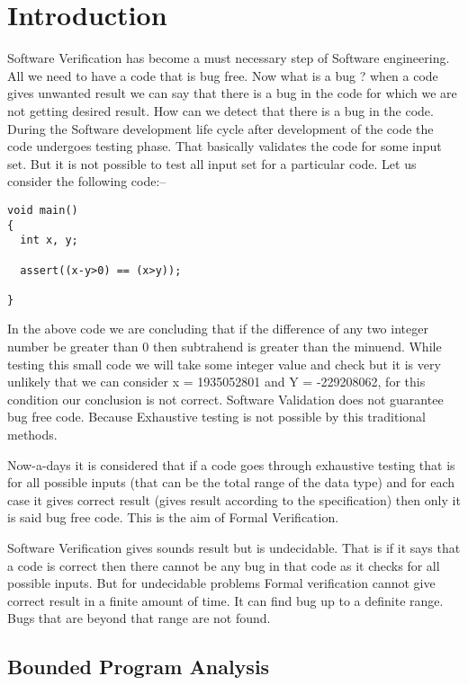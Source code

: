 \chapter{Introduction}
Software Verification has become a must necessary step of Software engineering.
All we need to have a code that is bug free. Now what is a bug ? when a code 
gives unwanted result we can say that there is a bug in the code for which we 
are not getting desired result. How can we detect that there is a bug in the 
code. During the Software development life cycle after development of the code
the code undergoes testing phase. That basically validates the code for some 
input set. But it is not possible to test all input set for a particular code.
Let us consider the following 
code:--

\begin{verbatim}
void main()
{
  int x, y;  
  
  assert((x-y>0) == (x>y));
     
}
\end{verbatim}

In the above code we are concluding that if the difference of any two integer
number be greater than 0 then subtrahend is greater than the minuend. While 
testing this small code we will take some integer value and check but it is 
very unlikely that we can consider x = 1935052801 and Y = -229208062, for this
condition our conclusion is not correct. Software Validation does not guarantee
bug free code. Because Exhaustive testing is not possible by this traditional 
methods. 

Now-a-days it is considered that if a code goes through exhaustive testing that
is for all possible inputs (that can be the total range of the data type) and
for each case it gives correct result (gives result according to the specification) 
then only it is said bug free code. This is the aim of Formal Verification.

Software Verification gives sounds result but is undecidable. That is if it says 
that a code is correct then there cannot be any bug in that code as it checks for 
all possible inputs. But for undecidable problems Formal verification cannot give
correct result in a finite amount of time. It can find bug up to a definite range.
Bugs that are beyond that range are not found. 

\section {Bounded Program Analysis}

